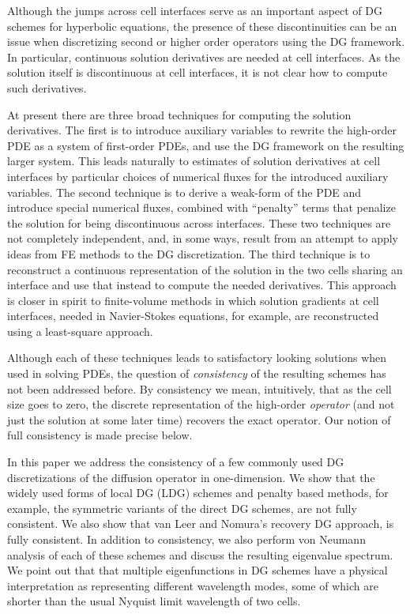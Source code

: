 \documentclass[final]{siamltex}
\begin{document}
Although the jumps across cell interfaces serve as an important aspect
of DG schemes for hyperbolic equations, the presence of these
discontinuities can be an issue when discretizing second or higher
order operators using the DG framework. In particular, continuous
solution derivatives are needed at cell interfaces. As the solution
itself is discontinuous at cell interfaces, it is not clear how to
compute such derivatives.

At present there are three broad techniques for computing the solution
derivatives. The first is to introduce auxiliary variables to rewrite
the high-order PDE as a system of first-order PDEs, and use the DG
framework on the resulting larger system. This leads naturally to
estimates of solution derivatives at cell interfaces by particular
choices of numerical fluxes for the introduced auxiliary variables.
The second technique is to derive a weak-form of the PDE and introduce
special numerical fluxes, combined with ``penalty'' terms that
penalize the solution for being discontinuous across interfaces. These
two techniques are not completely independent, and, in some ways,
result from an attempt to apply ideas from FE methods to the DG
discretization. The third technique is to reconstruct a continuous
representation of the solution in the two cells sharing an interface
and use that instead to compute the needed derivatives. This approach
is closer in spirit to finite-volume methods in which solution
gradients at cell interfaces, needed in Navier-Stokes equations, for
example, are reconstructed using a least-square approach.

Although each of these techniques leads to satisfactory looking
solutions when used in solving PDEs, the question of
\emph{consistency} of the resulting schemes has not been addressed
before. By consistency we mean, intuitively, that as the cell size
goes to zero, the discrete representation of the high-order
\emph{operator} (and not just the solution at some later time)
recovers the exact operator. Our notion of full consistency is made
precise below.

In this paper we address the consistency of a few commonly used DG
discretizations of the diffusion operator in one-dimension. We show
that the widely used forms of local DG (LDG)
schemes\cite{Cockburn:1998uy} and penalty based methods, for example,
the symmetric variants of the direct DG schemes\cite{Liu:2010eq}, are
not fully consistent. We also show that van Leer and Nomura's recovery
DG approach\cite{vanLeer:2005kk}, is fully consistent. In addition to
consistency, we also perform von Neumann analysis of each of these
schemes and discuss the resulting eigenvalue spectrum. We point out
that that multiple eigenfunctions in DG schemes have a physical
interpretation as representing different wavelength modes, some of
which are shorter than the usual Nyquist limit wavelength of two
cells.
\end{document}
